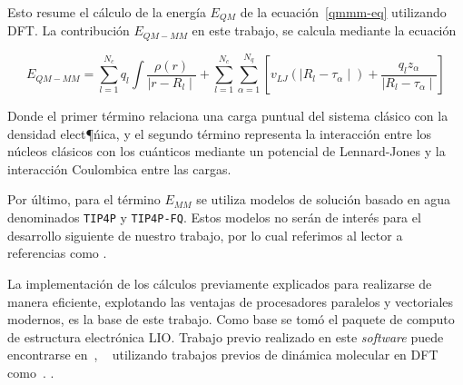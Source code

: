 Esto resume el c\'alculo de la energ\'ia $E_{QM}$ de la ecuaci\'on~\ref{qmmm-eq} utilizando DFT.
La contribuci\'on $E_{QM-MM}$ en este trabajo, se calcula mediante la ecuaci\'on

\begin{equation}
    E_{QM-MM} = \sum_{l = 1}^{N_c} q_l \int \frac{\rho(r)}{\mid r - R_l \mid} + \sum_{l = 1}^{N_c}\sum_{\alpha = 1}^{N_q} [ v_{LJ} ( \mid R_l - \tau_\alpha \mid ) + \frac{q_l z_\alpha}{\mid R_l - \tau_\alpha \mid} ]
\end{equation}

Donde el primer t\'ermino relaciona una carga puntual del sistema cl\'asico con la densidad
elect¶\'nica, y el segundo t\'ermino representa la interacci\'on entre los n\'ucleos cl\'asicos
con los cu\'anticos mediante un potencial de Lennard-Jones y la interacci\'on Coulombica entre
las cargas.

Por \'ultimo, para el t\'ermino $E_{MM}$ se utiliza modelos de soluci\'on basado en
agua denominados \texttt{TIP4P} y \texttt{TIP4P-FQ}. Estos modelos no ser\'an de inter\'es
para el desarrollo siguiente de nuestro trabajo, por lo cual referimos al lector a
referencias como .

La implementaci\'on de los c\'alculos previamente explicados para realizarse de manera
eficiente, explotando las ventajas de procesadores paralelos y vectoriales modernos, es
la base de este trabajo. Como base se tom\'o el paquete de computo de estructura electr\'onica
LIO. Trabajo previo realizado en este \textit{software} puede encontrarse en~\cite{PaperNitscheManu},
~\cite{TesisNitsche} utilizando trabajos previos de din\'amica molecular en DFT como~\cite{Yasuda}.
.

